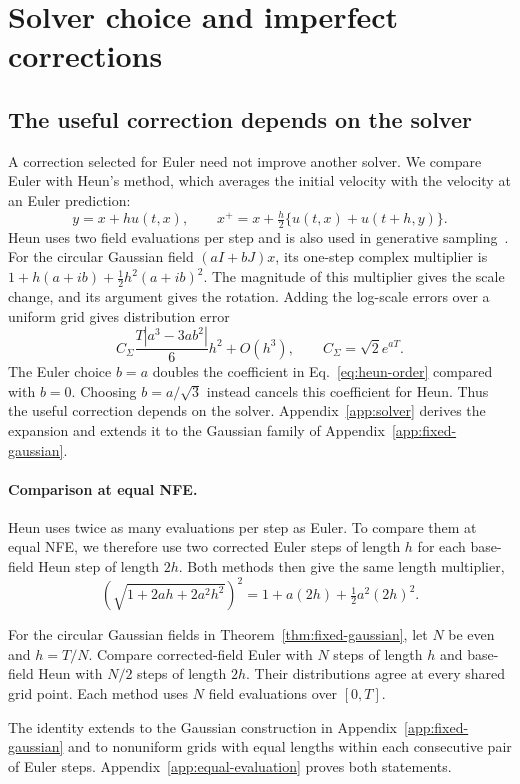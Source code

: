 \FloatBarrier
\section{Solver choice and imperfect corrections}
\label{sec:limits}

\subsection{The useful correction depends on the solver}
\label{sec:solvers}

A correction selected for Euler need not improve another solver. We compare Euler with Heun's method, which averages the initial velocity with the velocity at an Euler prediction:
\[
 y=x+hu(t,x),\qquad
 x^+=x+\tfrac h2\{u(t,x)+u(t+h,y)\}.
\]
Heun uses two field evaluations per step and is also used in generative sampling~\citep{karras2022elucidating}. For the circular Gaussian field $(aI+bJ)x$, its one-step complex multiplier is $1+h(a+ib)+\tfrac12h^2(a+ib)^2$. The magnitude of this multiplier gives the scale change, and its argument gives the rotation. Adding the log-scale errors over a uniform grid gives distribution error
\begin{equation}
 C_\Sigma\frac{T|a^3-3ab^2|}{6}h^2+O(h^3),
 \qquad C_\Sigma=\sqrt{2}e^{aT}.
 \label{eq:heun-order}
\end{equation}
The Euler choice $b=a$ doubles the coefficient in Eq.~\eqref{eq:heun-order} compared with $b=0$. Choosing $b=a/\sqrt3$ instead cancels this coefficient for Heun. Thus the useful correction depends on the solver. Appendix~\ref{app:solver} derives the expansion and extends it to the Gaussian family of Appendix~\ref{app:fixed-gaussian}.

\paragraph{Comparison at equal NFE.}
Heun uses twice as many evaluations per step as Euler. To compare them at equal NFE, we therefore use two corrected Euler steps of length $h$ for each base-field Heun step of length $2h$. Both methods then give the same length multiplier,
\[
 \left(\sqrt{1+2ah+2a^2h^2}\right)^2
 =1+a(2h)+\tfrac12a^2(2h)^2.
\]
\begin{proposition}
\label{prop:equal-nfe}
For the circular Gaussian fields in Theorem~\ref{thm:fixed-gaussian}, let $N$ be even and $h=T/N$. Compare corrected-field Euler with $N$ steps of length $h$ and base-field Heun with $N/2$ steps of length $2h$. Their distributions agree at every shared grid point. Each method uses $N$ field evaluations over $[0,T]$.
\end{proposition}
The identity extends to the Gaussian construction in Appendix~\ref{app:fixed-gaussian} and to nonuniform grids with equal lengths within each consecutive pair of Euler steps. Appendix~\ref{app:equal-evaluation} proves both statements.


